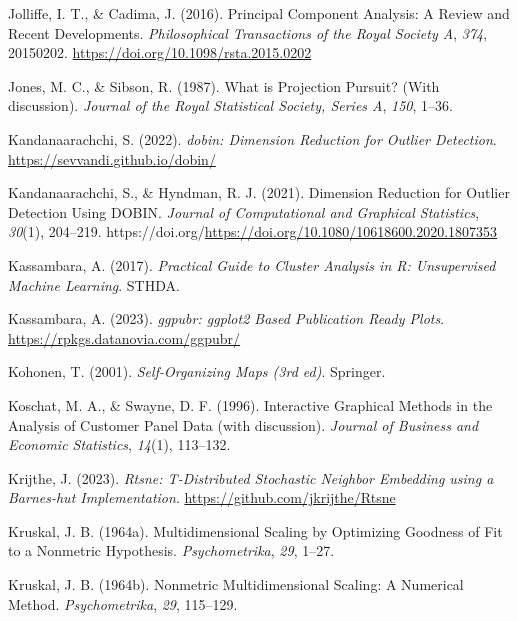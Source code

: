\documentclass[
  letterpaper,
]{krantz}
\newlength{\cslhangindent}
\newenvironment{CSLReferences}[2] %
 {\begin{list}{}{%
  \setlength{\itemindent}{0pt}
  \setlength{\leftmargin}{0pt}
  \setlength{\parsep}{0pt}
  \ifodd #1
   \setlength{\leftmargin}{\cslhangindent}
   \setlength{\itemindent}{-1\cslhangindent}
  \fi
  \setlength{\itemsep}{#2\baselineskip}}}
 {\end{list}}
\begin{document}
\begin{CSLReferences}{1}{0}
Jolliffe, I. T., \& Cadima, J. (2016). Principal {C}omponent {A}nalysis:
A {R}eview and {R}ecent {D}evelopments. \emph{Philosophical Transactions
of the Royal Society A}, \emph{374}, 20150202.
\url{https://doi.org/10.1098/rsta.2015.0202}

Jones, M. C., \& Sibson, R. (1987). {W}hat is {P}rojection {P}ursuit?
(With discussion). \emph{Journal of the Royal Statistical Society,
Series A}, \emph{150}, 1--36.

Kandanaarachchi, S. (2022). \emph{{dobin}: {D}imension {R}eduction for
{O}utlier {D}etection}. \url{https://sevvandi.github.io/dobin/}

Kandanaarachchi, S., \& Hyndman, R. J. (2021). Dimension {R}eduction for
{O}utlier {D}etection {U}sing DOBIN. \emph{Journal of Computational and
Graphical Statistics}, \emph{30}(1), 204--219.
https://doi.org/\url{https://doi.org/10.1080/10618600.2020.1807353}

Kassambara, A. (2017). \emph{Practical {G}uide to {C}luster {A}nalysis
in {R}: {U}nsupervised {M}achine {L}earning}. STHDA.

Kassambara, A. (2023). \emph{{ggpubr}: {ggplot2} {B}ased {P}ublication
{R}eady {P}lots}. \url{https://rpkgs.datanovia.com/ggpubr/}

Kohonen, T. (2001). \emph{Self-{O}rganizing {M}aps (3rd ed)}. Springer.

Koschat, M. A., \& Swayne, D. F. (1996). Interactive {G}raphical
{M}ethods in the {A}nalysis of {C}ustomer {P}anel {D}ata (with
discussion). \emph{Journal of Business and Economic Statistics},
\emph{14}(1), 113--132.

Krijthe, J. (2023). \emph{{Rtsne}: {T-D}istributed {S}tochastic
{N}eighbor {E}mbedding using a {B}arnes-hut {I}mplementation}.
\url{https://github.com/jkrijthe/Rtsne}

Kruskal, J. B. (1964a). Multidimensional {S}caling by {O}ptimizing
{G}oodness of {F}it to a {N}onmetric {H}ypothesis. \emph{Psychometrika},
\emph{29}, 1--27.

Kruskal, J. B. (1964b). Nonmetric {M}ultidimensional {S}caling: A
{N}umerical {M}ethod. \emph{Psychometrika}, \emph{29}, 115--129.


\end{CSLReferences}
\end{document}
